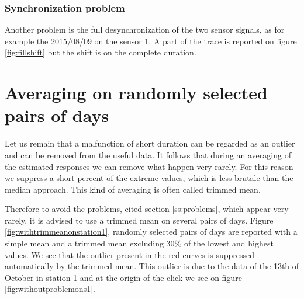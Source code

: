 

\newpage\clearpage
\subsubsection{Synchronization problem}
Another problem is the full desynchronization of the two sensor signals, as for example the 2015/08/09 on the sensor 1. A part of the trace is reported on figure \ref{fig:fillshift} but the shift is on the complete duration.


\newpage\clearpage
\section{Averaging on randomly selected pairs of days}


Let us remain that a malfunction of short duration can be regarded as an outlier and can be removed from the useful data. It follows that during an averaging of the estimated responses we can remove what happen very rarely. For this reason we suppress a short percent of the extreme values, which is less brutale than the median approach. This kind of averaging is often called trimmed mean.

Therefore to avoid the problems, cited section \ref{ss:problems}, which appear very rarely, it is advised to use a trimmed mean on several pairs of days. Figure \ref{fig:withtrimmeanonstation1}, randomly selected pairs of days are reported with a simple mean 
and a trimmed mean excluding $30\%$ of the lowest and highest values. We see that the outlier present in the red curves is suppressed automatically by the trimmed mean. This outlier is due to the data of the 13th of October in station 1 and at the origin of the click we see on figure \ref{fig:withoutproblemons1}.   


